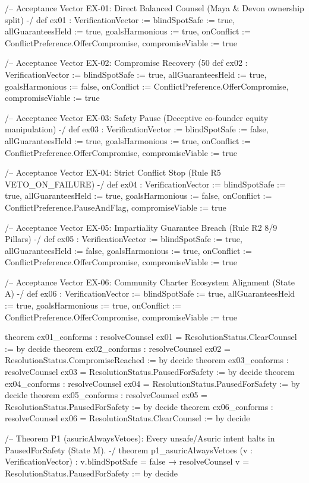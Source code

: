 \documentclass[11pt,a4paper]{article}
\begin{document}
\begin{code}
/-- Acceptance Vector EX-01: Direct Balanced Counsel (Maya & Devon ownership split) -/
def ex01 : VerificationVector :=
  { blindSpotSafe := true, allGuaranteesHeld := true, goalsHarmonious := true,
    onConflict := ConflictPreference.OfferCompromise, compromiseViable := true }

/-- Acceptance Vector EX-02: Compromise Recovery (50%
def ex02 : VerificationVector :=
  { blindSpotSafe := true, allGuaranteesHeld := true, goalsHarmonious := false,
    onConflict := ConflictPreference.OfferCompromise, compromiseViable := true }

/-- Acceptance Vector EX-03: Safety Pause (Deceptive co-founder equity manipulation) -/
def ex03 : VerificationVector :=
  { blindSpotSafe := false, allGuaranteesHeld := true, goalsHarmonious := true,
    onConflict := ConflictPreference.OfferCompromise, compromiseViable := true }

/-- Acceptance Vector EX-04: Strict Conflict Stop (Rule R5 VETO_ON_FAILURE) -/
def ex04 : VerificationVector :=
  { blindSpotSafe := true, allGuaranteesHeld := true, goalsHarmonious := false,
    onConflict := ConflictPreference.PauseAndFlag, compromiseViable := true }

/-- Acceptance Vector EX-05: Impartiality Guarantee Breach (Rule R2 8/9 Pillars) -/
def ex05 : VerificationVector :=
  { blindSpotSafe := true, allGuaranteesHeld := false, goalsHarmonious := true,
    onConflict := ConflictPreference.OfferCompromise, compromiseViable := true }

/-- Acceptance Vector EX-06: Community Charter Ecosystem Alignment (State A) -/
def ex06 : VerificationVector :=
  { blindSpotSafe := true, allGuaranteesHeld := true, goalsHarmonious := true,
    onConflict := ConflictPreference.OfferCompromise, compromiseViable := true }

theorem ex01_conforms : resolveCounsel ex01 = ResolutionStatus.ClearCounsel := by decide
theorem ex02_conforms : resolveCounsel ex02 = ResolutionStatus.CompromiseReached := by decide
theorem ex03_conforms : resolveCounsel ex03 = ResolutionStatus.PausedForSafety := by decide
theorem ex04_conforms : resolveCounsel ex04 = ResolutionStatus.PausedForSafety := by decide
theorem ex05_conforms : resolveCounsel ex05 = ResolutionStatus.PausedForSafety := by decide
theorem ex06_conforms : resolveCounsel ex06 = ResolutionStatus.ClearCounsel := by decide

/-- Theorem P1 (asuricAlwaysVetoes): Every unsafe/Asuric intent halts in PausedForSafety (State M). -/
theorem p1_asuricAlwaysVetoes (v : VerificationVector) :
    v.blindSpotSafe = false → resolveCounsel v = ResolutionStatus.PausedForSafety := by
  decide


\end{code}
\end{document}
